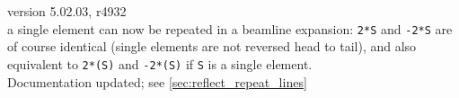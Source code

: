\begin{madlist}
  
   version 5.02.03, r4932 \\
  a single element can now be repeated in a beamline expansion:
  \texttt{2*S} and \texttt{-2*S} are of course identical (single
  elements are not reversed head to tail), and also equivalent to
  \texttt{2*(S)} and \texttt{-2*(S)} if \texttt{S} is a single
  element.\\
  Documentation updated; see \ref{sec:reflect_repeat_lines}


\end{madlist}
  


\newpage

